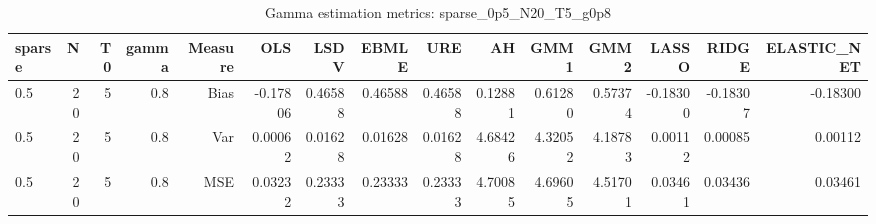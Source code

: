 \begin{table}[!htbp]\centering
\caption{Gamma estimation metrics: sparse_0p5_N20_T5_g0p8}
\label{tab:table1_sparse_0p5_N20_T5_g0p8}
\begin{tabular}{lrrrrrrrrrrrrrr}
\hline
sparse & N & T0 & gamma & Measure & OLS & LSDV & EBMLE & URE & AH & GMM1 & GMM2 & LASSO & RIDGE & ELASTIC_NET \\
\hline
0.5 & 20 & 5 & 0.8 & Bias & -0.17806 & 0.46588 & 0.46588 & 0.46588 & 0.12881 & 0.61280 & 0.57374 & -0.18300 & -0.18307 & -0.18300 \\
0.5 & 20 & 5 & 0.8 & Var & 0.00062 & 0.01628 & 0.01628 & 0.01628 & 4.68426 & 4.32052 & 4.18783 & 0.00112 & 0.00085 & 0.00112 \\
0.5 & 20 & 5 & 0.8 & MSE & 0.03232 & 0.23333 & 0.23333 & 0.23333 & 4.70085 & 4.69605 & 4.51701 & 0.03461 & 0.03436 & 0.03461 \\
\hline
\end{tabular}
\end{table}


